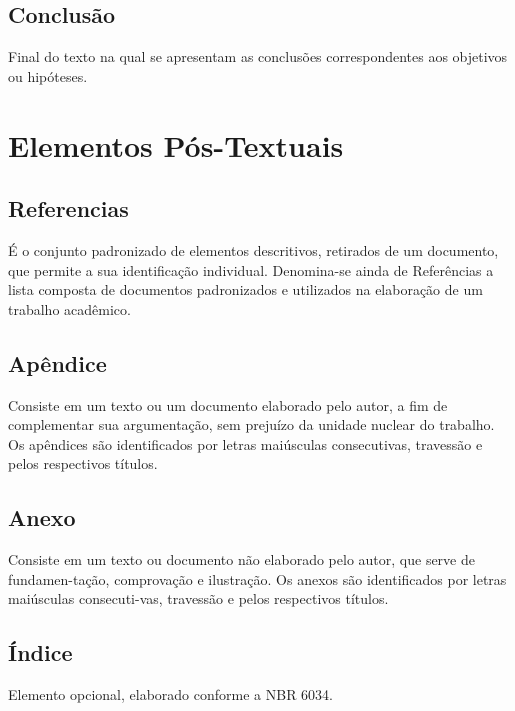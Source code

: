 \subsection{Conclusão}

Final do texto na qual se apresentam as conclusões correspondentes aos objetivos ou hipóteses.

\section{Elementos Pós-Textuais}

\subsection{Referencias}

É o conjunto padronizado de elementos descritivos, retirados de
um documento, que permite a sua identificação individual. Denomina-se ainda de Referências a lista composta de documentos padronizados e utilizados na elaboração de um trabalho acadêmico.

\subsection{Apêndice}

Consiste em um texto ou um documento elaborado pelo autor, a fim
de complementar sua argumentação, sem prejuízo da unidade nuclear do trabalho. Os apêndices são identificados por letras maiúsculas consecutivas, travessão e pelos respectivos títulos.

\subsection{Anexo}

Consiste em um texto ou documento não elaborado pelo autor, que
serve de fundamen-tação, comprovação e ilustração. Os anexos são identificados por letras maiúsculas consecuti-vas, travessão e pelos respectivos títulos.

\subsection{Índice}

Elemento opcional, elaborado conforme a NBR 6034.

